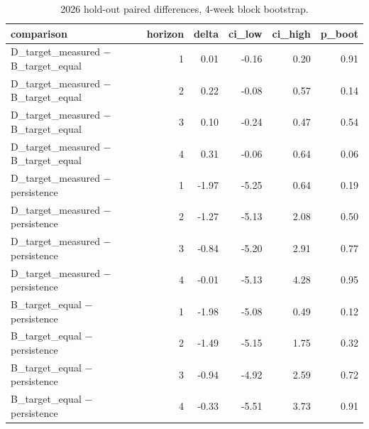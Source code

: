 \begin{table}[t]
\centering
\small
\caption{2026 hold-out paired differences, 4-week block bootstrap.}
\label{tab:holdout-2026-bootstrap}
\begin{tabular}{lrrrrr}
\toprule
comparison & horizon & delta & ci\_low & ci\_high & p\_boot \\
\midrule
D\_target\_measured − B\_target\_equal & 1 & 0.01 & -0.16 & 0.20 & 0.91 \\
D\_target\_measured − B\_target\_equal & 2 & 0.22 & -0.08 & 0.57 & 0.14 \\
D\_target\_measured − B\_target\_equal & 3 & 0.10 & -0.24 & 0.47 & 0.54 \\
D\_target\_measured − B\_target\_equal & 4 & 0.31 & -0.06 & 0.64 & 0.06 \\
D\_target\_measured − persistence & 1 & -1.97 & -5.25 & 0.64 & 0.19 \\
D\_target\_measured − persistence & 2 & -1.27 & -5.13 & 2.08 & 0.50 \\
D\_target\_measured − persistence & 3 & -0.84 & -5.20 & 2.91 & 0.77 \\
D\_target\_measured − persistence & 4 & -0.01 & -5.13 & 4.28 & 0.95 \\
B\_target\_equal − persistence & 1 & -1.98 & -5.08 & 0.49 & 0.12 \\
B\_target\_equal − persistence & 2 & -1.49 & -5.15 & 1.75 & 0.32 \\
B\_target\_equal − persistence & 3 & -0.94 & -4.92 & 2.59 & 0.72 \\
B\_target\_equal − persistence & 4 & -0.33 & -5.51 & 3.73 & 0.91 \\
\bottomrule
\end{tabular}
\end{table}
